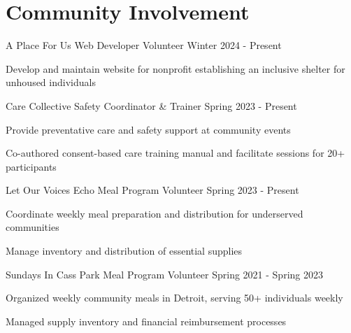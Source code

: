 \documentclass{../styles/cv}
\begin{document}
\section{Community Involvement}

\subsectionpositiondate
    {A Place For Us}
    {Web Developer Volunteer}
    {Winter 2024 - Present}
\resumesublistbegin
    \item Develop and maintain website for nonprofit establishing an inclusive shelter for unhoused individuals
\resumesublistend

\subsectionpositiondate
    {Care Collective}
    {Safety Coordinator \& Trainer}
    {Spring 2023 - Present}
\resumesublistbegin
    \item Provide preventative care and safety support at community events
    \item Co-authored consent-based care training manual and facilitate sessions for 20+ participants
\resumesublistend

\subsectionpositiondate
    {Let Our Voices Echo}
    {Meal Program Volunteer}
    {Spring 2023 - Present}
\resumesublistbegin
    \item Coordinate weekly meal preparation and distribution for underserved communities
    \item Manage inventory and distribution of essential supplies
\resumesublistend

\subsectionpositiondate
    {Sundays In Cass Park}
    {Meal Program Volunteer}
    {Spring 2021 - Spring 2023}
\resumesublistbegin
    \item Organized weekly community meals in Detroit, serving 50+ individuals weekly
    \item Managed supply inventory and financial reimbursement processes
\resumesublistend
\end{document}
